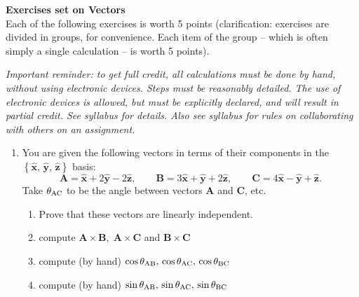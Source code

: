 \documentclass{article}
\begin{document}
{\bf Exercises set on Vectors }\\

Each of the following exercises is worth 5 points (clarification: exercises are divided in groups, for convenience. Each item of the group -- which is often simply a single calculation --  is worth 5 points). 

\emph{Important reminder: to get full credit, all calculations must be done by hand, without using electronic devices. Steps must be reasonably detailed.  The use of electronic devices is allowed, but must be explicitly declared, and will result in partial credit. See syllabus for details. Also see syllabus for rules on collaborating with others on an assignment.   }  




\begin{enumerate}

\item You are given the following vectors in terms of their components in
the $\left\{ \mathbf{\hat{x}},\,\mathbf{\hat{y}},\mathbf{\, \hat{z}}\right\} $ basis: 
\[
\mathbf{A}=\mathbf{\hat{x}}+2\mathbf{\hat{y}-}2\mathbf{\hat{z}, \quad \quad B}=3\mathbf{\hat{x}}+\mathbf{\hat{y}+}2\mathbf{\hat{z}, \quad \quad C}=4\mathbf{\hat{x}}-\mathbf{\hat{y}+\hat{z}.}
\]
Take $\theta_{\rm AC}$ to be the angle between vectors $\mathbf{A}$ and $\mathbf{C}$, etc. 

\begin{enumerate}
\item Prove that these vectors are linearly independent. 




\item compute  $\mathbf{A\times B,\;A\times C}$ and $\mathbf{B\times C}$

\item compute (by hand) $\cos \theta_{\rm AB},\,\cos \theta_{\rm AC},\,\cos \theta_{\rm BC}$

\item  compute (by hand) $\sin \theta_{\rm AB},\,\sin \theta_{\rm AC},\,\sin \theta_{\rm BC}$


\end{enumerate}
\end{enumerate}
\end{document}
